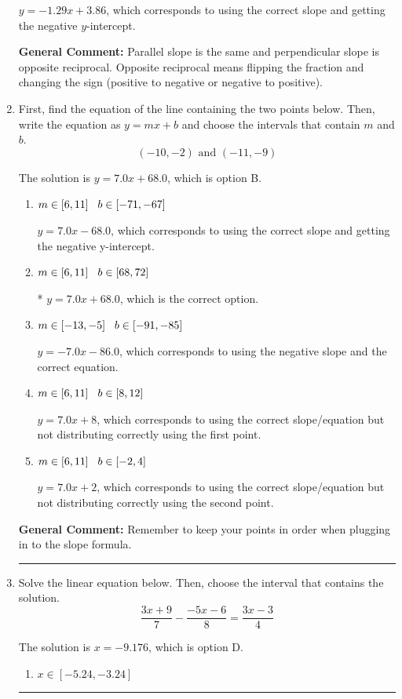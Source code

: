 \documentclass{extbook}[14pt]
\newcommand{\litem}[1]{\item #1

\rule{\textwidth}{0.4pt}}
\begin{document}
\begin{enumerate}
{\begin{enumerate}[label=\Alph*.]
 $y = -1.29x + 3.86$, which corresponds to using the correct slope and getting the negative $y$-intercept.
\end{enumerate}

\textbf{General Comment:} Parallel slope is the same and perpendicular slope is opposite reciprocal. Opposite reciprocal means flipping the fraction and changing the sign (positive to negative or negative to positive).
}
\litem{
First, find the equation of the line containing the two points below. Then, write the equation as $ y=mx+b $ and choose the intervals that contain $m$ and $b$.
\[ (-10, -2) \text{ and } (-11, -9) \]

The solution is \( y = 7.0x + 68.0 \), which is option B.\begin{enumerate}[label=\Alph*.]
\item \( m \in [6, 11] \hspace*{3mm} b \in [-71, -67] \)

 $y = 7.0x -68.0$, which corresponds to using the correct slope and getting the negative y-intercept.
\item \( m \in [6, 11] \hspace*{3mm} b \in [68, 72] \)

* $y = 7.0x + 68.0$, which is the correct option.
\item \( m \in [-13, -5] \hspace*{3mm} b \in [-91, -85] \)

 $y = -7.0x -86.0$, which corresponds to using the negative slope and the correct equation.
\item \( m \in [6, 11] \hspace*{3mm} b \in [8, 12] \)

 $y = 7.0x + 8$, which corresponds to using the correct slope/equation but not distributing correctly using the first point.
\item \( m \in [6, 11] \hspace*{3mm} b \in [-2, 4] \)

 $y = 7.0x + 2$, which corresponds to using the correct slope/equation but not distributing correctly using the second point.
\end{enumerate}

\textbf{General Comment:} Remember to keep your points in order when plugging in to the slope formula.
}
\litem{
Solve the linear equation below. Then, choose the interval that contains the solution.
\[ \frac{3x + 9}{7} - \frac{-5x -6}{8} = \frac{3x -3}{4} \]

The solution is \( x = -9.176 \), which is option D.\begin{enumerate}[label=\Alph*.]
\item \( x \in [-5.24, -3.24] \)


\end{enumerate}}
\end{enumerate}
\end{document}
